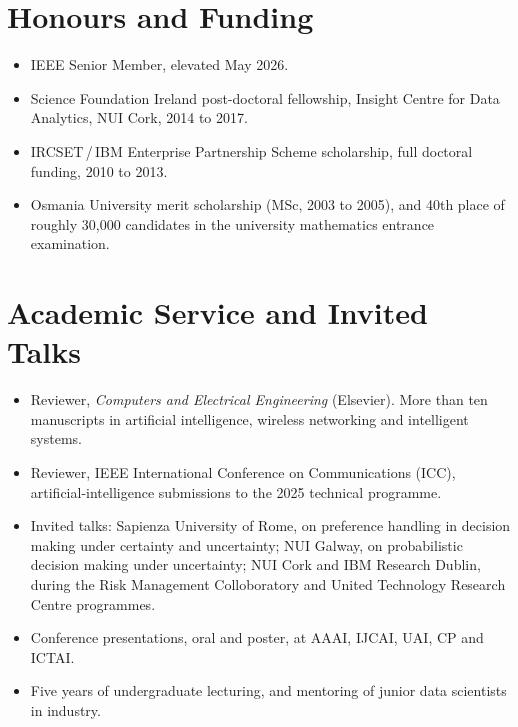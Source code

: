 \documentclass[9pt,letterpaper]{extarticle}
\newenvironment{plainlist}
  {\begin{itemize}[leftmargin=11pt, topsep=2pt, itemsep=2.4pt, parsep=0pt,
                   label={\color{accent}\rule[1.6pt]{2.6pt}{2.6pt}}]}
  {\end{itemize}}
\begin{document}
\section{Honours and Funding}
\begin{plainlist}
  \item IEEE Senior Member, elevated May 2026.
  \item Science Foundation Ireland post-doctoral fellowship, Insight Centre for Data Analytics,
        NUI Cork, 2014 to 2017.
  \item IRCSET\,/\,IBM Enterprise Partnership Scheme scholarship, full doctoral funding, 2010 to 2013.
  \item Osmania University merit scholarship (MSc, 2003 to 2005), and 40th place of roughly
        30{,}000 candidates in the university mathematics entrance examination.
\end{plainlist}

\section{Academic Service and Invited Talks}
\begin{plainlist}
  \item Reviewer, \textit{Computers and Electrical Engineering} (Elsevier). More than ten
        manuscripts in artificial intelligence, wireless networking and intelligent systems.
  \item Reviewer, IEEE International Conference on Communications (ICC), artificial-intelligence
        submissions to the 2025 technical programme.
  \item Invited talks: Sapienza University of Rome, on preference handling in decision making under
        certainty and uncertainty; NUI Galway, on probabilistic decision making under uncertainty;
        NUI Cork and IBM Research Dublin, during the Risk Management Colloboratory and United
        Technology Research Centre programmes.
  \item Conference presentations, oral and poster, at AAAI, IJCAI, UAI, CP and ICTAI.
  \item Five years of undergraduate lecturing, and mentoring of junior data scientists in industry.
\end{plainlist}

\end{document}
